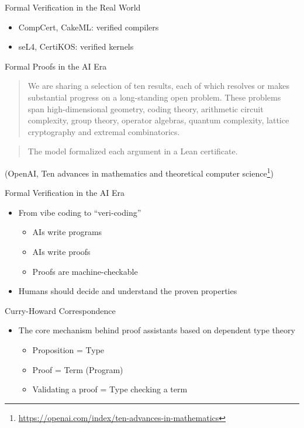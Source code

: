 \documentclass{beamer}
\begin{document}
\begin{frame}{Formal Verification in the Real World}
  \begin{itemize}
    \item CompCert, CakeML: verified compilers
    \item seL4, CertiKOS: verified kernels
  \end{itemize}
\end{frame}

\begin{frame}{Formal Proofs in the AI Era}
  \begin{quote}
    We are sharing a selection of ten results, each of which resolves or makes
    substantial progress on a long-standing open problem. These problems span
    high-dimensional geometry, coding theory, arithmetic circuit complexity,
    group theory, operator algebras, quantum complexity, lattice cryptography
    and extremal combinatorics.
  \end{quote}

  \begin{quote}
    The model formalized each argument in a Lean certificate.
  \end{quote}

  (OpenAI, Ten advances in mathematics and theoretical computer science\footnote{\url{https://openai.com/index/ten-advances-in-mathematics}})
\end{frame}

\begin{frame}{Formal Verification in the AI Era}
  \begin{itemize}
    \item From vibe coding to ``veri-coding''
      \begin{itemize}
        \item AIs write programs
        \item AIs write proofs
        \item Proofs are machine-checkable
      \end{itemize}
    \item Humans should decide and understand the proven properties
  \end{itemize}
\end{frame}

\begin{frame}{Curry-Howard Correspondence}
  \begin{itemize}
    \item The core mechanism behind proof assistants based on dependent type theory
      \begin{itemize}
        \item Proposition = Type
        \item Proof = Term (Program)
        \item Validating a proof = Type checking a term
      \end{itemize}
  \end{itemize}
\end{frame}
\end{document}
